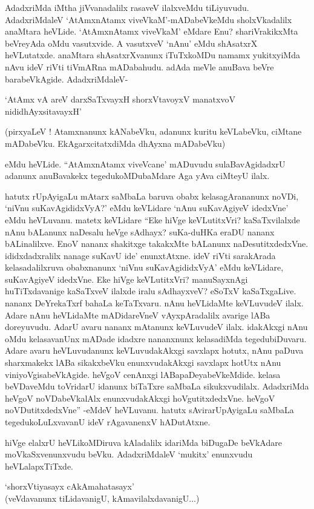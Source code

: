 AdadxriMda iMtha jiVvanadalilx rasaveV ilalxveMdu tiLiyuvudu. AdadxriMdaleV `AtAmxnAtamx viveVkaM'-mADabeVkeMdu sholxVkadalilx anaMtara heVLide. `AtAmxnAtamx viveVkaM' eMdare Enu? shariVrakikxMta beVreyAda oMdu vasutxvide. A vasutxveV `nAnu' eMdu shAsatxrX heVLutatxde. anaMtara shAsatxrXvanunx iTuTxkoMDu namamx yukitxyiMda nAvu ideV riVti tiVmARna mADabahudu. adAda meVle anuBava beVre barabeVkAgide. AdadxriMdaleV-

\begin{shloka}
`AtAmx vA areV darxSaTxvayxH shorxVtavoyxV manatxvoV nididhAyxsitavayxH'
\end{shloka}

(pirxyaLeV ! Atamxnanunx kANabeVku, adanunx kuritu keVLabeVku, ciMtane mADabeVku. EkAgarxcitatxdiMda dhAyxna mADabeVku)

eMdu heVLide. ``AtAmxnAtamx viveVcane' mADuvudu sulaBavAgidadxrU adanunx anuBavakekx tegedukoMDubaMdare Aga yAva ciMteyU ilalx.

hatutx rUpAyigaLu mAtarx saMbaLa baruva obabx kelasagArananunx noVDi, `niVnu suKavAgididxVyA?' eMdu keVLidare `nAnu suKavAgiyeV idedxVne' eMdu heVLuvanu. matetx keVLidare ``Eke hiVge keVLutitxVri? kaSaTxvilalxde nAnu bALanunx naDesalu heVge sAdhayx? suKa-duHKa eraDU nananx bALinalilxve. EnoV nananx shakitxge takakxMte bALanunx naDesutitxdedxVne. ididxdadxralilx nanage suKavU ide' enunxtAtxne. ideV riVti sarakArada kelasadalilxruva obabxnanunx `niVnu suKavAgididxVyA' eMdu keVLidare, suKavAgiyeV idedxVne. Eke hiVge keVLutitxVri? manuSayxnAgi huTiTxdavanige kaSaTxveV ilalxde iralu sAdhayxveV? eSoTxV kaSaTxgaLive. nananx DeYrekaTxrf bahaLa keTaTxvaru. nAnu heVLidaMte keVLuvudeV ilalx. Adare nAnu heVLidaMte mADidareVneV vAyxpAradalilx avarige lABa doreyuvudu. AdarU avaru nananx mAtanunx keVLuvudeV ilalx. idakAkxgi nAnu oMdu kelasavanUnx mADade idadxre nananxnunx kelasadiMda tegedubiDuvaru. Adare avaru heVLuvudanunx keVLuvudakAkxgi savxlapx hotutx, nAnu paDuva sharxmakekx lABa sikakxbeVku enunxvudakAkxgi savxlapx hotUtx nAnu viniyoVgisabeVkAgide. heVgoV cenAnxgi lABapaDeyabeVkeMdide. kelasa beVDaveMdu toVridarU idanunx biTaTxre saMbaLa sikukxvudilalx. AdadxriMda heVgoV noVDabeVkalAlx enunxvudakAkxgi hoVgutitxdedxVne. heVgoV noVDutitxdedxVne'' -eMdeV heVLuvanu. hatutx sAvirarUpAyigaLu saMbaLa tegedukoLuLxvavanU ideV rAgavanenxV hADutAtxne.

hiVge elalxrU heVLikoMDiruva kAladalilx idariMda biDugaDe beVkAdare moVkaSxvenunxvudu beVku. AdadxriMdaleV `mukitx' enunxvudu heVLalapxTiTxde.

\begin{shloka}
`shorxVtiyasayx cAkAmahatasayx'\\
(veVdavanunx tiLidavanigU, kAmavilalxdavanigU$\ldots$)
\end{shloka}

